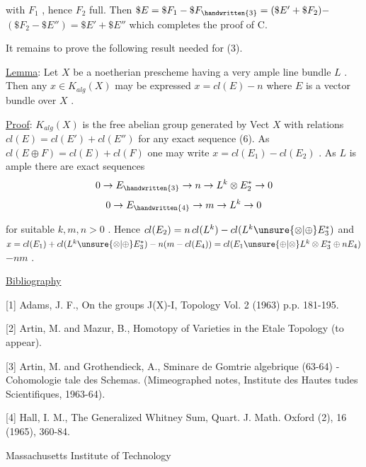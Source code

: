 with $F_1$ , hence $F_2$ full. Then $\$E = \$F_1 - \$F_{\handwritten{3}} = (\$E' + \$F_2) -$
$(\$F_2 - \$E'') = \$E' + \$E''$ which completes the proof of C.

It remains to prove the following result needed for (3).

\uline{Lemma}: Let $X$ be a noetherian prescheme having a very
ample line bundle $L$ . Then any $x \in K_{alg}(X)$ may be expressed
$x = cl(E) - n$ where $E$ is a vector bundle over $X$ .

\uline{Proof}: $K_{alg}(X)$ is the free abelian group generated by Vect $X$
with relations $cl(E) = cl(E') + cl(E'')$ for any exact sequence (6).
As $cl(E \oplus F) = cl(E) + cl(F)$ one may write $x = cl(E_1) - cl(E_2)$ .
As $L$ is ample there are exact sequences
\[ 0 \to E_{\handwritten{3}} \to n \to L^k \otimes E_2^* \to 0 \]
\[ 0 \to E_{\handwritten{4}} \to m \to L^k \to 0 \]



for suitable $k,m,n > 0$ . Hence $cl(E_2) = n\,cl(L^k) - cl(L^k \unsure{\otimes|\oplus} E_3^{*})$ 
and $x = cl(E_1) + cl(L^k \unsure{\otimes|\oplus} E_3^{*}) - n(m - cl(E_4)) = cl(E_1 \unsure{\oplus|\otimes} L^k \otimes E_3^{*} \oplus nE_4)$
$- nm$ .

\uline{Bibliography}

[1] Adams, J. F., On the groups J(X)-I, Topology Vol. 2 (1963)
p.p. 181-195.

[2] Artin, M. and Mazur, B., Homotopy of Varieties in the
Etale Topology (to appear).

[3] Artin, M. and Grothendieck, A., Sminare de Gomtrie
algebrique (63-64) - Cohomologie tale des Schemas.
(Mimeographed notes, Institute des Hautes tudes 
Scientifiques, 1963-64).

[4] Hall, I. M., The Generalized Whitney Sum, Quart. J. Math.
Oxford (2), 16 (1965), 360-84.

Massachusetts Institute of Technology

